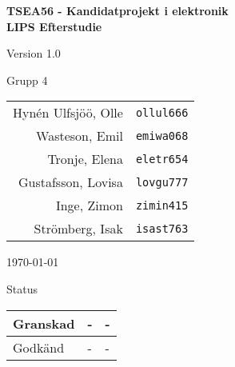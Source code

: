 \documentclass[11pt]{article}
\begin{document}
\begin{titlepage}
\begin{center}

{\Large\bfseries TSEA56 - Kandidatprojekt i elektronik \\ LIPS Efterstudie}

\vspace{5em}

Version 1.0

\vspace{5em}
Grupp 4 \\
\begin{tabular}{rl}
Hynén Ulfsjöö, Olle&\verb+ollul666+
\\
Wasteson, Emil&\verb+emiwa068+
\\
Tronje, Elena&\verb+eletr654+
\\
Gustafsson, Lovisa&\verb+lovgu777+
\\
Inge, Zimon&\verb+zimin415+
\\
Strömberg, Isak&\verb+isast763+
\\
\end{tabular}

\vspace{5em}
\today

\vspace{16em}
Status
\begin{longtable}{|l|l|l|} \hline

Granskad & - & - \\ \hline
Godkänd & - & - \\ \hline
 
\end{longtable}

\end{center}
\end{titlepage}
\end{document}
